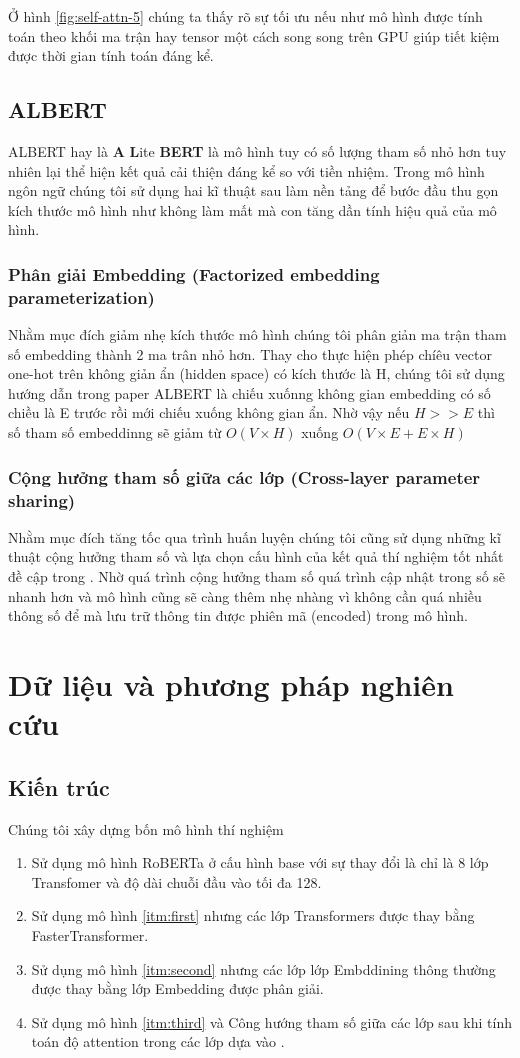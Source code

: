 \documentclass[10pt, conference, a4paper, compsocconf]{IEEEtran}
\begin{document}
Ở hình \ref{fig:self-attn-5} chúng ta thấy rõ sự tối ưu nếu như mô hình được tính toán theo khối ma trận hay tensor một cách song song 
trên GPU giúp tiết kiệm được thời gian tính toán đáng kể.
\subsection{ALBERT}
ALBERT\cite{Lan2019} hay là \textbf{A} \textbf{L}ite \textbf{BERT} là mô hình tuy có số lượng tham số nhỏ hơn \cite{Devlin2018} tuy nhiên lại thể hiện kết quả cải thiện đáng kể so với tiền nhiệm.
Trong mô hình ngôn ngữ chúng tôi sử dụng hai kĩ thuật sau làm nền tảng để bước đầu thu gọn kích thước mô hình như không làm mất mà con tăng dần tính hiệu quả của mô hình.
\subsubsection{Phân giải Embedding (Factorized embedding parameterization)}
Nhằm mục đích giảm nhẹ kích thước mô hình chúng tôi phân giản ma trận tham số embedding thành 2 ma trân nhỏ hơn.
Thay cho thực hiện phép chíêu vector one-hot trên không giản ẩn (hidden space) có kích thước là H, chúng tôi sử dụng hướng dẫn trong paper
ALBERT\cite{Lan2019} là chiếu xuốnng không gian embedding có số chiều là E trước rồi mới chiếu xuống không gian ẩn.
Nhờ vậy nếu $H>>E$ thì số tham số embeddinng sẽ giảm từ $O(V \times H)$ xuống $O(V \times E + E \times H)$
\subsubsection{Cộng hưởng tham số giữa các lớp (Cross-layer parameter sharing)}
Nhằm mục đích tăng tốc qua trình huấn luyện chúng tôi cũng sử dụng những kĩ thuật cộng hưởng tham số và lựa chọn cấu hình của kết quả thí nghiệm tốt nhất đề cập trong \cite{Lan2019}.
Nhờ quá trình cộng hưởng tham số quá trình cập nhật trong số sẽ nhanh hơn và mô hình cũng sẽ càng thêm nhẹ nhàng vì không cần quá nhiều thông số để mà lưu trữ thông tin được phiên mã (encoded) trong mô hình.
\section{Dữ liệu và phương pháp nghiên cứu}
\subsection{Kiến trúc}
Chúng tôi xây dựng bốn mô hình thí nghiệm
\begin{enumerate}
  \item \label{itm:first} Sử dụng mô hình RoBERTa\cite{Liu2019} ở cấu hình base 
  với sự thay đổi là chỉ là 8 lớp Transfomer và độ dài chuỗi đầu vào tối đa 128.
	\item \label{itm:second} Sử dụng mô hình \ref{itm:first} nhưng các lớp Transformers được thay bằng FasterTransformer.
	\item \label{itm:third} Sử dụng mô hình \ref{itm:second} nhưng các lớp lớp Embddining thông thường được thay bằng lớp Embedding được phân giải.
	\item \label{itm:forth} Sử dụng mô hình \ref{itm:third} và Công hướng tham số giữa các lớp sau khi tính toán độ attention trong các lớp dựa vào \cite{Lan2019}.
\end{enumerate}
\end{document}
